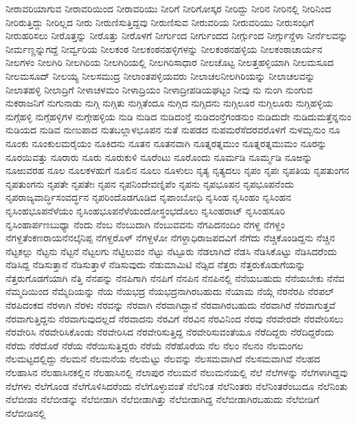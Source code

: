 {ನೀರಾವರಿಯಾಗುವ
ನೀರಾವರಿಯಿಂದ
ನೀರಾವರಿಯು
ನೀರಿಗೆ
ನೀರಿಗೋಸ್ಕರ
ನೀರಿದ್ದು
ನೀರಿನ
ನೀರಿನಲ್ಲಿ
ನೀರಿನಿಂದ
ನೀರಿರುತ್ತಿದ್ದು
ನೀರಿಲ್ಲದ
ನೀರು
ನೀರುಣಿಸುತ್ತಿದ್ದವು
ನೀರುಣಿಸುವ
ನೀರುವರಿಯ
ನೀರುವರಿಯು
ನೀರುಸಂಧಿಗೆ
ನೀರುಹರಿಸಲು
ನೀರೊತ್ತನ್ನು
ನೀರೊತ್ತು
ನೀರೊಳಗೆ
ನೀರ್ಗುಂದ
ನೀರ್ಗುಂದದ
ನೀರ್ಗ್ಗುಂದ
ನೀರ್ಗ್ಗುನ್ದೆಳಾ
ನೀರ್ನೆಲವನ್ನು
ನೀರ್ಮಣ್ಣನ್ನುಗದ್ದೆ
ನೀರ್ವ್ವರಿಯ
ನೀಲಕಂಠ
ನೀಲಕಂಠನಹಳ್ಳಿಗಳನ್ನು
ನೀಲಕಂಠನಹಳ್ಳಿಯ
ನೀಲಕಂಠಾಚಾರ್ಯನ
ನೀಲಗಳಂ
ನೀಲಗಿರಿ
ನೀಲಗಿರಿಯ
ನೀಲಗಿರಿಯಲ್ಲಿ
ನೀಲಗಿರಿಸಾಧಾರ
ನೀಲಚೊಟ್ಟ
ನೀಲತ್ತಹಳ್ಳಿಯಾಗಿ
ನೀಲಮಸೂದ
ನೀಲಮಸೂದ್
ನೀಲಯ್ಯ
ನೀಲಸಮುದ್ರ
ನೀಲಾಂತಪಳ್ಳಿಯವರು
ನೀಲಾಚಲನೀಲಗಿರಿಯನ್ನು
ನೀಲಾಚಲವನ್ನು
ನೀಲಾತಹಳ್ಳಿ
ನೀಲಾದ್ರಿಗೆ
ನೀಳಾಚಳಮಂ
ನೀಳಾದ್ರಿಯಂ
ನೀಳಾದ್ರೀಪಡಿಯಘಟ್ಟಂ
ನೀವು
ನು
ನುಂಗಿ
ನುಂಗುವ
ನುಕರಾಜನಿಗೆ
ನುಗುನಾಡು
ನುಗ್ಗಿ
ನುಗ್ಗಿತು
ನುಗ್ಗಿತೆಂದೂ
ನುಗ್ಗಿದ
ನುಗ್ಗಿದನು
ನುಗ್ಗಿಲೂರ
ನುಗ್ಗಿಲೂರು
ನುಗ್ಗಿಹಳ್ಳಿಯ
ನುಗ್ಗೆಹಳ್ಳಿ
ನುಗ್ಗೆಹಳ್ಳಿಗಳ
ನುಗ್ಗೇಹಳ್ಳಿಯ
ನುಡಿ
ನುಡಿದ
ನುಡಿದಂನ್ತೆ
ನುಡಿದಂನ್ತೆಗಂಡನುಂ
ನುಡಿದುದೇ
ನುಡಿದುಮತ್ತೆನ್ನನುಂ
ನುಡಿಯದ
ನುಡಿವ
ನುಣುಪಾದ
ನುತಬಲ್ಲಾಳಭೂಪನ
ನುತೆ
ನುಪಡದ
ನುಪಮರೆಸೆದರವರೊಳಗೆ
ನುಳಮ್ಬನುಂ
ನೂ
ನೂಂಕು
ನೂಂಕುಲಮರೈಯಂ
ನೂಕಿದನು
ನೂತನ
ನೂತನವಾಗಿ
ನೂತ್ನರತ್ನಮುಂ
ನೂತ್ನರತ್ನಮುಮಂ
ನೂರನ್ನು
ನೂರಯಿವತ್ತು
ನೂರಾರು
ನೂರು
ನೂರುಕುಳಿ
ನೂರೆಂಟು
ನೂರೊಂದು
ನೂರ್ಮಡಿ
ನೂರ್ಮ್ಮಡಿ
ನೂಱನ್ನು
ನೂಱುವರಹ
ನೂಲ
ನೂಲಕಳಹುಗೆ
ನೂಲಿನ
ನೂಲು
ನೂಳುಲು
ನೃತ್ಯ
ನೃತ್ಯದಲು
ನೃಪಂ
ನೃಪಃ
ನೃಪತಿಯ
ನೃಪತುಂಗನ
ನೃಪತುಂಗನು
ನೃಪತೇ
ನೃಪತೇಃ
ನೃಪನ
ನೃಪನಿಂದೇವಣ್ನಿಪೆಂ
ನೃಪನು
ನೃಪಭೂಪನ
ನೃಪಭೂಪನೆಂದು
ನೃಪರಾಜ್ಯವಾರ್ದ್ಧಿಸಂವರ್ದ್ಧನ
ನೃಪರಿಂದೊಡಗೂಡಿದ
ನೃಪಾಂಬೋಧಿ
ನೃಸಿಂಹ
ನೃಸಿಂಹಂ
ನೃಸಿಂಹನ
ನೃಸಿಂಹಭೂಪನೆಳೆಯಂ
ನೃಸಿಂಹಭೂಪನೆಳೆಯಂದೋಸ್ಥಂಭದೊಲು
ನೃಸಿಂಹರಾಟ್
ನೃಸಿಂಹಸೂರಿ
ನೃಸಿಂಹಾರ್ಪಣಬುಧ್ಯಾ
ನೆಂದು
ನೆಂಬ
ನೆಂಬುದಾಗಿ
ನೆಂಬುವವನು
ನೆಗಪಿದನಂದಿಂ
ನೆಗಳ್ದ
ನೆಗಳ್ದಂ
ನೆಗಳ್ದತೆಂಕಣರಾಯನೆನಲ್ಕೆನಿಪ್ಪ
ನೆಗಳ್ದರೊಳ್
ನೆಗಳ್ದಳೋ
ನೆಗಳ್ದಾಧಿರಾಜಪದವಿಗೆ
ನೆಗೆದು
ನೆಚ್ಚಿಕೊಂಡಿದ್ದನು
ನೆಚ್ಚಿನ
ನೆಟ್ಟಕಲ್ಲು
ನೆಟ್ಟನು
ನೆಟ್ಟನೆ
ನೆಟ್ಟಲಗು
ನೆಟ್ಟಿಲುವಂ
ನೆಟ್ಟು
ನೆಟ್ಟೂರು
ನೆಡಲಾಗಿದೆ
ನೆಡಸಿ
ನೆಡಿಸಿಕೊಟ್ಟು
ನೆಡಿಸಿದರೆಂದು
ನೆಡಿಸಿದ್ದ
ನೆಡಿಸುತ್ತಾನೆ
ನೆಡಿಸುತ್ತಾಳೆ
ನೆಡಿಸುವುದು
ನೆಡುಮಾಮಿಟಿ
ನೆಡ್ಸಿದ
ನೆತ್ತರು
ನೆತ್ತರುಕೊಡುಗೆಯನ್ನು
ನೆತ್ತರುಗೊಡಗೆಯಾಗಿ
ನೆತ್ತಿ
ನೆನಪನ್ನು
ನೆನಪಿಗಾಗಿ
ನೆನಪಿಗೆ
ನೆನಪಿನ
ನೆನಪಿನಲ್ಲಿ
ನೆನೆಯಬಹುದು
ನೆನೆಯಬೇಕು
ನೆನೆವ
ನೆಮ್ಮದಿಯಿಂದ
ನೆಮ್ಮೆದಿಯನ್ನು
ನೆಯ
ನೆಯಭದ್ರ
ನೆಯಭದ್ರನಾಗಿರಬಹುದು
ನೆಯಾಮ
ನೆಯ್ಗೆ
ನೆರನೆರಪಿ
ನೆರಪಲ್
ನೆರಪಿದಂಕದ
ನೆರಳಾಗಿ
ನೆರಳು
ನೆರವನ್ನು
ನೆರವಾಗಿ
ನೆರವಾಗಿದ್ದಾನೆ
ನೆರವಾಗಿರಬಹುದು
ನೆರವಾಗಿರೆ
ನೆರವಾಗುತ್ತವೆ
ನೆರವಾಗುತ್ತಿದ್ದನು
ನೆರವಾಗುವುದಲ್ಲದೆ
ನೆರವಾದನು
ನೆರವಿಗೆ
ನೆರವಿನ
ನೆರವಿನಿಂದ
ನೆರವು
ನೆರವೇರದೇ
ನೆರವೇರಿಸಲು
ನೆರವೇರಿಸಿ
ನೆರವೇರಿಸಿಕೊಂಡು
ನೆರವೇರಿಸಿದ
ನೆರವೇರಿಸುತ್ತಿದ್ದ
ನೆರವೇರಿಸುವಂತೆಯೂ
ನೆರೆದಿದ್ದರು
ನೆರೆದಿದ್ದರೆಂದು
ನೆರೆದು
ನೆರೆದೊರೆ
ನೆರೆಯ
ನೆರೆಯಿಸುತ್ತಿದ್ದರು
ನೆರೆಯೆ
ನೆರೆಹೊರೆಯ
ನೆಲ
ನೆಲಂ
ನೆಲನಂ
ನೆಲಮಂಗಲ
ನೆಲಮಟ್ಟದಲ್ಲಿದ್ದು
ನೆಲಮನೆ
ನೆಲಮನೆಯ
ನೆಲಮೆಟ್ಟು
ನೆಲವನ್ನು
ನೆಲಸಮವಾಗಿದೆ
ನೆಲಸಮವಾಗಿವೆ
ನೆಲಹದ
ನೆಲಹಾಸಿನ
ನೆಲಹಾಸಿನಕಲ್ಲಿನ
ನೆಲಹಾಸಿನಲ್ಲಿ
ನೆಲಾಪುರ
ನೆಲುಮನೆ
ನೆಲುಮನೆಯಲ್ಲಿ
ನೆಲೆ
ನೆಲೆಗಳನ್ನು
ನೆಲೆಗಳಾಗಿದ್ದವು
ನೆಲೆಗಳು
ನೆಲೆಗೊಂಡ
ನೆಲೆಗೊಳಿಸಿದರೆಂದು
ನೆಲೆಗೊಳ್ಳುವಂತೆ
ನೆಲೆನಿಂತ
ನೆಲೆನಿಂತರು
ನೆಲೆನಿಂತರೆಂಬುದೂ
ನೆಲೆನಿಂತು
ನೆಲೆಬೀಡಂ
ನೆಲೆಬೀಡನ್ನು
ನೆಲೆಬೀಡಾಗಿ
ನೆಲೆಬೀಡಾಗಿತ್ತು
ನೆಲೆಬೀಡಾಗಿದ್ದ
ನೆಲೆಬೀಡಾಗಿರಬಹುದು
ನೆಲೆಬೀಡಿಗೆ
ನೆಲೆಬೀಡಿನಲ್ಲಿ
}
